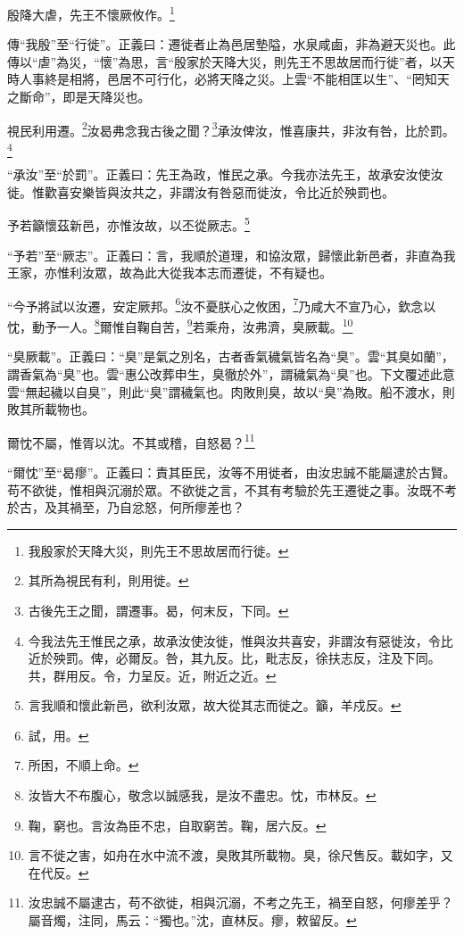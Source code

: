 殷降大虐，先王不懷厥攸作。\footnote{我殷家於天降大災，則先王不思故居而行徙。}

{\noindent\zhuan{}\fzbyks 傳“我殷”至“行徙”。正義曰：遷徙者止為邑居墊隘，水泉咸鹵，非為避天災也。此傳以“虐”為災，“懷”為思，言“殷家於天降大災，則先王不思故居而行徙”者，以天時人事終是相將，邑居不可行化，必將天降之災。上雲“不能相匡以生”、“罔知天之斷命”，即是天降災也。 \par}

視民利用遷。\footnote{其所為視民有利，則用徙。}汝曷弗念我古後之聞？\footnote{古後先王之聞，謂遷事。曷，何末反，下同。}承汝俾汝，惟喜康共，非汝有咎，比於罰。\footnote{今我法先王惟民之承，故承汝使汝徙，惟與汝共喜安，非謂汝有惡徙汝，令比近於殃罰。俾，必爾反。咎，其九反。比，毗志反，徐扶志反，注及下同。共，群用反。令，力呈反。近，附近之近。}

{\noindent\shu{}\fzkt “承汝”至“於罰”。正義曰：先王為政，惟民之承。今我亦法先王，故承安汝使汝徙。惟歡喜安樂皆與汝共之，非謂汝有咎惡而徙汝，令比近於殃罰也。 \par}

予若籲懷茲新邑，亦惟汝故，以丕從厥志。\footnote{言我順和懷此新邑，欲利汝眾，故大從其志而徙之。籲，羊戍反。}

{\noindent\shu{}\fzkt “予若”至“厥志”。正義曰：言，我順於道理，和協汝眾，歸懷此新邑者，非直為我王家，亦惟利汝眾，故為此大從我本志而遷徙，不有疑也。 \par}

“今予將試以汝遷，安定厥邦。\footnote{試，用。}汝不憂朕心之攸困，\footnote{所困，不順上命。}乃咸大不宣乃心，欽念以忱，動予一人。\footnote{汝皆大不布腹心，敬念以誠感我，是汝不盡忠。忱，市林反。}爾惟自鞠自苦，\footnote{鞠，窮也。言汝為臣不忠，自取窮苦。鞠，居六反。}若乘舟，汝弗濟，臭厥載。\footnote{言不徙之害，如舟在水中流不渡，臭敗其所載物。臭，徐尺售反。載如字，又在代反。}

{\noindent\shu{}\fzkt “臭厥載”。正義曰：“臭”是氣之別名，古者香氣穢氣皆名為“臭”。雲“其臭如蘭”，謂香氣為“臭”也。雲“惠公改葬申生，臭徹於外”，謂穢氣為“臭”也。下文覆述此意雲“無起穢以自臭”，則此“臭”謂穢氣也。肉敗則臭，故以“臭”為敗。船不渡水，則敗其所載物也。 \par}

爾忱不屬，惟胥以沈。不其或稽，自怒曷？\footnote{汝忠誠不屬逮古，苟不欲徙，相與沉溺，不考之先王，禍至自怒，何瘳差乎？屬音燭，注同，馬云：“獨也。”沈，直林反。瘳，敕留反。}

{\noindent\shu{}\fzkt “爾忱”至“曷瘳”。正義曰：責其臣民，汝等不用徙者，由汝忠誠不能屬逮於古賢。苟不欲徙，惟相與沉溺於眾。不欲徙之言，不其有考驗於先王遷徙之事。汝既不考於古，及其禍至，乃自忿怒，何所瘳差也？ \par}

